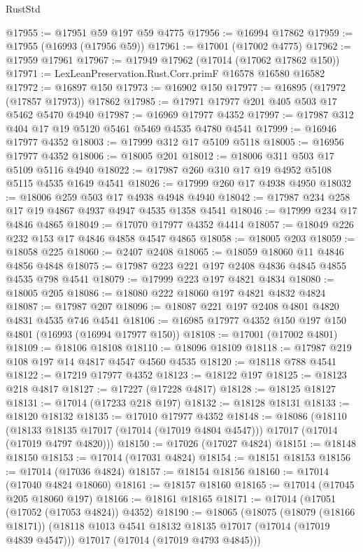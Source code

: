 \begin{lexlean}{RustStd}
\begin{coremodule}
@17955 := @17951 @59 @197 @59 @4775
@17956 := @16994 @17862
@17959 := @17955 (@16993 (@17956 @59))
@17961 := @17001 (@17002 @4775)
@17962 := @17959 @17961
@17967 := @17949 @17962 (@17014 (@17062 @17862 @150))
@17971 := LexLeanPreservation.Rust.Corr.primF @16578 @16580 @16582
@17972 := @16897 @150
@17973 := @16902 @150
@17977 := @16895 (@17972 (@17857 @17973)) @17862
@17985 := @17971 @17977 @201 @405 @503 @17 @5462 @5470 @4940
@17987 := @16969 @17977 @4352
@17997 := @17987 @312 @404 @17 @19 @5120 @5461 @5469 @4535 @4780 @4541
@17999 := @16946 @17977 @4352
@18003 := @17999 @312 @17 @5109 @5118
@18005 := @16956 @17977 @4352
@18006 := @18005 @201
@18012 := @18006 @311 @503 @17 @5109 @5116 @4940
@18022 := @17987 @260 @310 @17 @19 @4952 @5108 @5115 @4535 @1649 @4541
@18026 := @17999 @260 @17 @4938 @4950
@18032 := @18006 @259 @503 @17 @4938 @4948 @4940
@18042 := @17987 @234 @258 @17 @19 @4867 @4937 @4947 @4535 @1358 @4541
@18046 := @17999 @234 @17 @4846 @4865
@18049 := @17070 @17977 @4352 @4414
@18057 := @18049 @226 @232 @153 @17 @4846 @4858 @4547 @4865
@18058 := @18005 @203
@18059 := @18058 @225
@18060 := @2407 @2408
@18065 := @18059 @18060 @11 @4846 @4856 @4848
@18075 := @17987 @223 @221 @197 @2408 @4836 @4845 @4855 @4535 @798 @4541
@18079 := @17999 @223 @197 @4821 @4834
@18080 := @18005 @205
@18086 := @18080 @222 @18060 @197 @4821 @4832 @4824
@18087 := @17987 @207
@18096 := @18087 @221 @197 @2408 @4801 @4820 @4831 @4535 @746 @4541
@18106 := @16985 @17977 @4352 @150 @197 @150 @4801 (@16993 (@16994 @17977 @150))
@18108 := @17001 (@17002 @4801)
@18109 := @18106 @18108
@18110 := @18096 @18109
@18118 := @17987 @219 @108 @197 @14 @4817 @4547 @4560 @4535
@18120 := @18118 @788 @4541
@18122 := @17219 @17977 @4352
@18123 := @18122 @197
@18125 := @18123 @218 @4817
@18127 := @17227 (@17228 @4817)
@18128 := @18125 @18127
@18131 := @17014 (@17233 @218 @197)
@18132 := @18128 @18131
@18133 := @18120 @18132
@18135 := @17010 @17977 @4352
@18148 := @18086
    (@18110
      (@18133 @18135 @17017 (@17014 (@17019 @4804 @4547)))
      @17017
      (@17014 (@17019 @4797 @4820)))
@18150 := @17026 (@17027 @4824)
@18151 := @18148 @18150
@18153 := @17014 (@17031 @4824)
@18154 := @18151 @18153
@18156 := @17014 (@17036 @4824)
@18157 := @18154 @18156
@18160 := @17014 (@17040 @4824 @18060)
@18161 := @18157 @18160
@18165 := @17014 (@17045 @205 @18060 @197)
@18166 := @18161 @18165
@18171 := @17014 (@17051 (@17052 (@17053 @4824)) @4352)
@18190 := @18065
    (@18075
      (@18079 (@18166 @18171))
      (@18118 @1013 @4541 @18132 @18135 @17017 (@17014 (@17019 @4839 @4547)))
      @17017
      (@17014 (@17019 @4793 @4845)))

\end{coremodule}
\end{lexlean}
